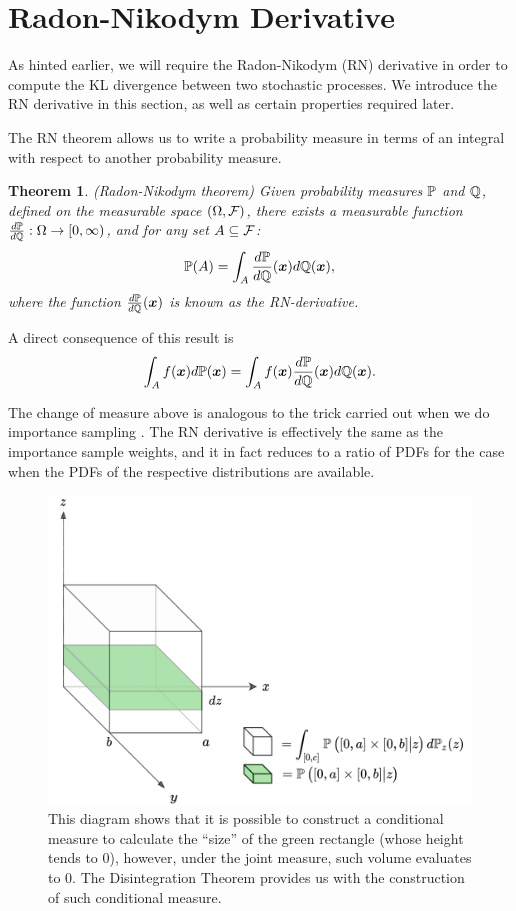 \documentclass[a4paper,12pt,twoside,openright]{report}
\newtheorem{theorem}{Theorem}
\theoremstyle{definition}
\begin{document}
\section{Radon-Nikodym Derivative}

As hinted earlier, we will require the Radon-Nikodym (RN) derivative in order to compute the KL divergence between two stochastic processes. We introduce the RN derivative in this section, as well as certain properties required later.

The RN theorem allows us to write a probability measure in terms of an integral with respect to another probability measure. 

\begin{theorem}
(Radon-Nikodym theorem)
Given probability measures $\P$ and $\Q$, defined on the measurable space $(\Omega, \calF)$, there exists a measurable function $\frac{d\P}{d\Q}:\Omega \rightarrow [0, \infty)$, and for any  set $A \subseteq  \calF$:
\begin{align}
    \P(A) = \int_{A} \frac{d\P}{d\Q}(\vx) d\Q(\vx),
\end{align}
where the function $\frac{d\P}{d\Q}(\vx)$ is known as the RN-derivative.
\end{theorem}

A direct consequence of this result is
\begin{align*}
    \int_A f(\vx) d\P(\vx) =  \int_{A} f(\vx)  \frac{d\P}{d\Q}(\vx)  d\Q(\vx).
\end{align*}

The change of measure above is analogous to the trick carried out when we do importance sampling \citep{martino2017effective}. The RN derivative is effectively the same as the importance sample weights, and it in fact reduces to a ratio of PDFs for the case when the PDFs of the respective distributions are available.
\begin{figure}[t!]
    \centering
    \includegraphics[scale=0.3]{images/disint2.png}
    \caption{ This diagram shows that it is possible to construct a conditional measure to calculate the ``size'' of the green rectangle (whose height tends to 0), however, under the joint measure, such volume evaluates to $0$. The Disintegration Theorem provides us with the construction of such conditional measure.}
    \label{fig:disintegration}
\end{figure}
\end{document}
